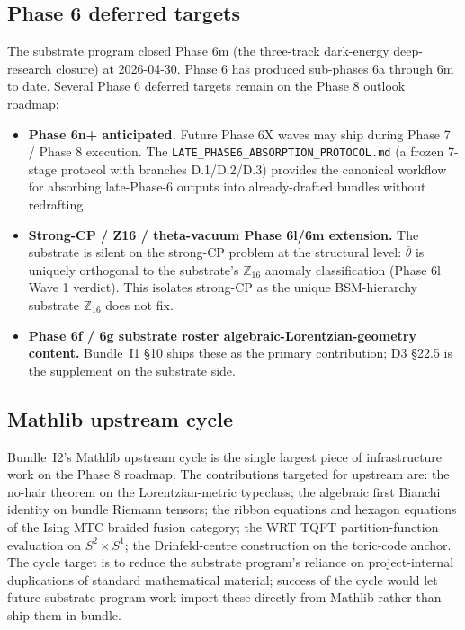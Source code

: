 \documentclass[aps,prd,reprint,nofootinbib,superscriptaddress]{revtex4-2}
\begin{document}
\subsection{Phase 6 deferred targets}

The substrate program closed Phase 6m (the three-track dark-energy
deep-research closure) at 2026-04-30. Phase 6 has produced
sub-phases 6a through 6m to date. Several Phase 6 deferred targets
remain on the Phase 8 outlook roadmap:

\begin{itemize}
\item \textbf{Phase 6n+ anticipated.} Future Phase 6X waves may ship
  during Phase 7 / Phase 8 execution. The
  \texttt{LATE\_PHASE6\_ABSORPTION\_PROTOCOL.md} (a frozen 7-stage
  protocol with branches D.1/D.2/D.3) provides the canonical
  workflow for absorbing late-Phase-6 outputs into already-drafted
  bundles without redrafting.
\item \textbf{Strong-CP / Z16 / theta-vacuum Phase 6l/6m extension.}
  The substrate is silent on the strong-CP problem at the structural
  level: $\bar\theta$ is uniquely orthogonal to the substrate's
  $\mathbb{Z}_{16}$ anomaly classification (Phase 6l Wave 1 verdict).
  This isolates strong-CP as the unique BSM-hierarchy substrate
  $\mathbb{Z}_{16}$ does not fix.
\item \textbf{Phase 6f / 6g substrate roster algebraic-Lorentzian-geometry
  content.} Bundle~I1 \S 10 ships these as the primary contribution;
  D3 \S 22.5 is the supplement on the substrate side.
\end{itemize}

\subsection{Mathlib upstream cycle}

Bundle~I2's Mathlib upstream cycle is the single largest piece of
infrastructure work on the Phase 8 roadmap. The contributions targeted
for upstream are: the no-hair theorem on the Lorentzian-metric
typeclass; the algebraic first Bianchi identity on bundle Riemann
tensors; the ribbon equations and hexagon equations of the Ising MTC
braided fusion category; the WRT TQFT partition-function evaluation
on $S^{2}\times S^{1}$; the Drinfeld-centre construction on the
toric-code anchor. The cycle target is to reduce the substrate
program's reliance on project-internal duplications of standard
mathematical material; success of the cycle would let future
substrate-program work import these directly from Mathlib rather than
ship them in-bundle.
\end{document}
